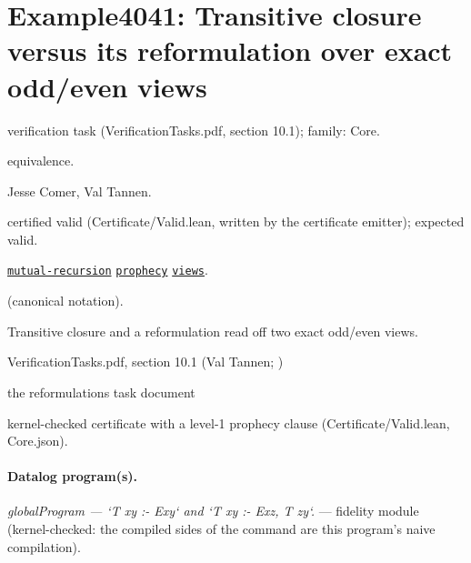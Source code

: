 \documentclass[10pt]{article}
\begin{document}
\Needspace{0.45\textheight}

\section{Example4041: Transitive closure versus its reformulation over exact odd/even views}\label{case:Example4041}

\begin{description}[leftmargin=2.6cm,style=nextline,itemsep=1pt]

\item[Category] verification task (VerificationTasks.pdf, section 10.1); family: Core.

\item[Kind] equivalence.

\item[Contributors] Jesse Comer, Val Tannen.

\item[Status] certified valid (Certificate/Valid.lean, written by the certificate emitter); expected valid.

\item[Tags] \hyperref[tag:mutual-recursion]{\texttt{mutual-recursion}} \hyperref[tag:prophecy]{\texttt{prophecy}} \hyperref[tag:views]{\texttt{views}}.

\item[Input]  (canonical notation).

\item[Summary] Transitive closure and a reformulation read off two exact odd/even views.

\item[Sources] {\raggedright VerificationTasks.pdf, section 10.1 (Val Tannen; ) \par the reformulations task document\par}

\item[Prophecy] kernel-checked certificate with a level-1 prophecy clause (Certificate/Valid.lean, Core.json).

\end{description}

\paragraph{Datalog program(s).}

{\raggedright\textit{globalProgram --- `T xy :- Exy` and `T xy :- Exz, T zy`.} --- fidelity module (kernel-checked: the compiled sides of the command are this program's naive compilation).\par}
\end{document}
